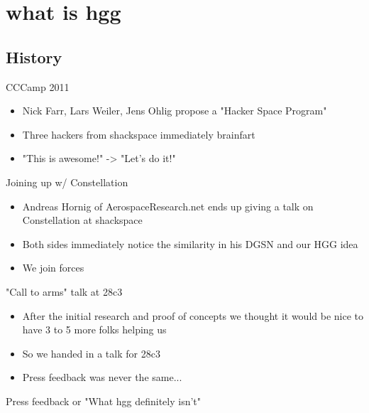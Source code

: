 
\newlength{\smallcol}
\setlength{\smallcol}{0.333333333333\textwidth}

\newlength{\bigcol}
\setlength{\bigcol}{\textwidth}
\addtolength{\bigcol}{- \smallcol}


\begin{frame}[plain]
\end{frame}

\section{what is hgg}

\subsection{History}
	\begin{frame}{CCCamp 2011}
		\begin{itemize}
			\item Nick Farr, Lars Weiler, Jens Ohlig propose a "Hacker Space Program"
			\item Three hackers from shackspace immediately brainfart
			\item "This is awesome!" -> "Let's do it!"
		\end{itemize}
	\end{frame}
	\begin{frame}{Joining up w/ Constellation}
		\begin{itemize}
			\item Andreas Hornig of AerospaceResearch.net ends up giving a talk on Constellation at shackspace
			\item Both sides immediately notice the similarity in his DGSN and our HGG idea
			\item We join forces
		\end{itemize}
	\end{frame}
	\begin{frame}{"Call to arms" talk at 28c3}
		\begin{itemize}
			\item After the initial research and proof of concepts we thought it would be nice to have 3 to 5 more folks helping us
			\item So we handed in a talk for 28c3
			\item Press feedback was never the same...
		\end{itemize}
	\end{frame}
	\begin{frame}{Press feedback or "What hgg definitely isn't"}
	\end{frame}

